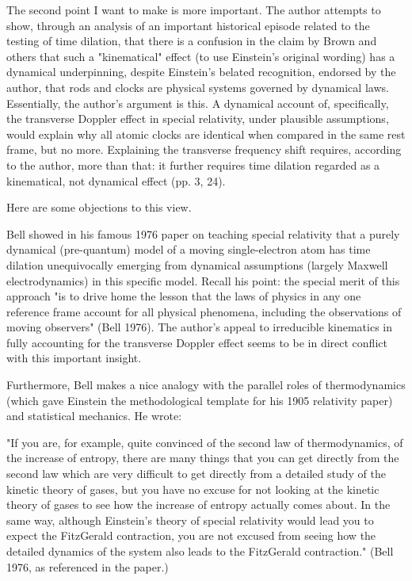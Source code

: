 \documentclass[submitted,11pt]{article}
\begin{document}
\begin{point}
The second point I want to make is more important. The author attempts to show, through an analysis of an important historical episode related to the testing of time dilation, that there is a confusion in the claim by Brown and others that such a "kinematical" effect (to use Einstein's original wording) has a dynamical underpinning, despite Einstein's belated recognition, endorsed by the author, that rods and clocks are physical systems governed by dynamical laws. Essentially, the author's argument is this. A dynamical account of, specifically, the transverse Doppler effect in special relativity, under plausible assumptions, would explain why all atomic clocks are identical when compared in the same rest frame, but no more. Explaining the transverse frequency shift requires, according to the author, more than that: it further requires time dilation regarded as a kinematical, not dynamical effect (pp. 3, 24).

Here are some objections to this view. 

Bell showed in his famous 1976 paper on teaching special relativity that a purely dynamical (pre-quantum) model of a moving single-electron atom has time dilation unequivocally emerging from dynamical assumptions (largely Maxwell electrodynamics) in this specific model. Recall his point: the special merit of this approach "is to drive home the lesson that the laws of physics in any one reference frame account for all physical phenomena, including the observations of moving observers" (Bell 1976). The author's appeal to irreducible kinematics in fully accounting for the transverse Doppler effect seems to be in direct conflict with this important insight.

Furthermore, Bell makes a nice analogy with the parallel roles of thermodynamics (which gave Einstein the methodological template for his 1905 relativity paper) and statistical mechanics. He wrote: 

"If you are, for example, quite convinced of the second law of thermodynamics, of the increase of entropy, there are many things that you can get directly from the second law which are very difficult to get directly from a detailed study of the kinetic theory of gases, but you have no excuse for not looking at the kinetic theory of gases to see how the increase of entropy actually comes about. In the same way, although Einstein's theory of special relativity would lead you to expect the FitzGerald contraction, you are not excused from seeing how the detailed dynamics of the system also leads to the FitzGerald contraction." (Bell 1976, as referenced in the paper.)


\end{point}
\end{document}
